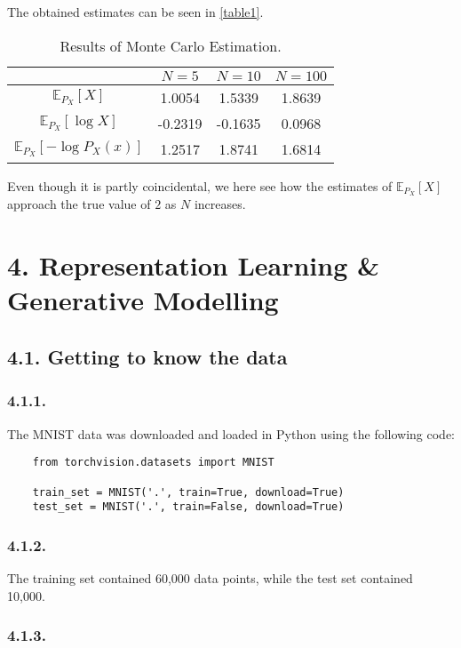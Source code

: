 \documentclass[a4paper, 12pt]{article}
\begin{document}
The obtained estimates can be seen in \autoref{table1}.

\begin{table}[H]
	\centering
	\begin{tabular}{|c||c|c|c|}
		\hline
		& $N=5$ & $N=10$ & $N=100$ \\
		\hline\hline
		$\mathbb{E}_{P_X}[X]$ & 1.0054 & 1.5339 & 1.8639 \\
		\hline
		$\mathbb{E}_{P_X}[\log X]$ & -0.2319 & -0.1635 & 0.0968 \\
		\hline
		$\mathbb{E}_{P_X}[- \log P_X(x)]$ & 1.2517 & 1.8741 & 1.6814 \\
		\hline
	\end{tabular}
	\label{table1}
	\caption{Results of Monte Carlo Estimation.}
\end{table}

Even though it is partly coincidental, we here see how the estimates of $\mathbb{E}_{P_X}[X]$ approach the true value of $2$ as $N$ increases.

\section{4. Representation Learning \& Generative Modelling}

\subsection{4.1. Getting to know the data}

\subsubsection{4.1.1.}

The MNIST data was downloaded and loaded in Python using the following code:

\begin{verbatim}
	from torchvision.datasets import MNIST
	
	train_set = MNIST('.', train=True, download=True)
	test_set = MNIST('.', train=False, download=True)
\end{verbatim}

\subsubsection{4.1.2.}

The training set contained 60,000 data points, while the test set contained 10,000.

\subsubsection{4.1.3.}
\end{document}
